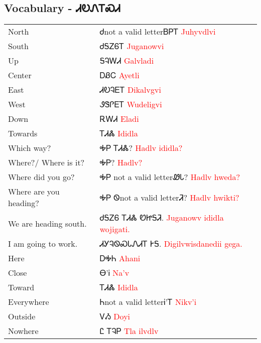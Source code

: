 \newpage\subsection{Vocabulary - ᏗᎧᏁᎢᏍᏗ 
}
\begin{minipage}{\linewidth}
\begin{tabular}{p{5cm} p{9cm}}
North & Ꮷnot a valid letterᏴᏢᎢ 
 \newline \textcolor{red}{Juhyvdlvi}\\
South & ᏧᎦᏃᏮᎢ 
 \newline \textcolor{red}{Juganowvi}\\
Up & ᎦᎸᎳᏗ 
 \newline \textcolor{red}{Galvladi}\\
Center & ᎠᏰᏟ 
 \newline \textcolor{red}{Ayetli}\\
East & ᏗᎧᎸᎬᎢ 
 \newline \textcolor{red}{Dikalvgvi}\\
West & ᏭᏕᎵᎬᎢ 
 \newline \textcolor{red}{Wudeligvi}\\
Down & ᎡᎳᏗ 
 \newline \textcolor{red}{Eladi}\\
Towards & ᎢᏗᏜ 
 \newline \textcolor{red}{Ididla}\\
Which way? & ᎭᏢ ᎢᏗᏜ? 
 \newline \textcolor{red}{Hadlv ididla?}\\
Where?/ Where is it? & ᎭᏢ? 
 \newline \textcolor{red}{Hadlv?}\\
Where did you go? & ᎭᏢ not a valid letterᏪᏓ? 
 \newline \textcolor{red}{Hadlv hweda?}\\
Where are you heading? & ᎭᏢ Ꮻnot a valid letterᏘ? 
 \newline \textcolor{red}{Hadlv hwikti?}\\
We are heading south. & ᏧᎦᏃᏮ ᎢᏗᏜ ᏬᏥᎦᏘ. 
 \newline \textcolor{red}{Juganowv ididla wojigati.}\\
I am going to work. & ᏗᎩᎸᏫᏍᏓᏁᏗᎢ ᎨᎦ. 
 \newline \textcolor{red}{Digilvwisdanedii gega.}\\
Here & ᎠᎭᏂ 
 \newline \textcolor{red}{Ahani}\\
Close & Ꮎ’Ꭵ 
 \newline \textcolor{red}{Na’v}\\
Toward & ᎢᏗᏜ 
 \newline \textcolor{red}{Ididla}\\
Everywhere & Ꮒnot a valid letterᎥ’Ꭲ 
 \newline \textcolor{red}{Nikv’i}\\
Outside & ᏙᏱ 
 \newline \textcolor{red}{Doyi}\\
Nowhere & Ꮭ ᎢᎸᏢ 
 \newline \textcolor{red}{Tla ilvdlv}\\
\end{tabular}
\end{minipage}


